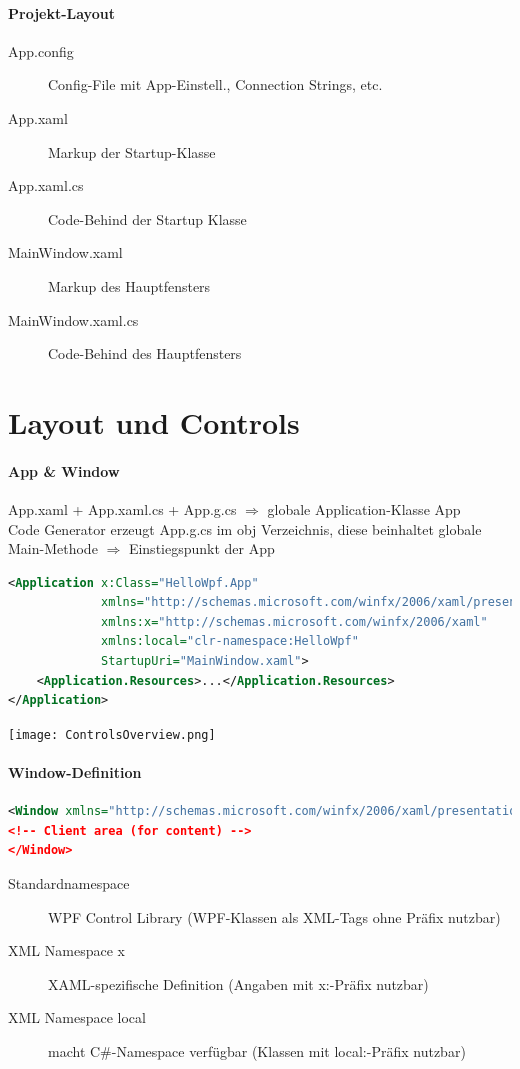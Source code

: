\paragraph{Projekt-Layout}
\begin{description}
    \item[App.config] Config-File mit App-Einstell., Connection Strings, etc.
    \item[App.xaml] Markup der Startup-Klasse
    \item[App.xaml.cs] Code-Behind der Startup Klasse
    \item[MainWindow.xaml] Markup des Hauptfensters
    \item[MainWindow.xaml.cs] Code-Behind des Hauptfensters
\end{description}

\section{Layout und Controls}

\paragraph{App \& Window}
App.xaml + App.xaml.cs + App.g.cs $\Rightarrow$ globale Application-Klasse App \\
Code Generator erzeugt App.g.cs im obj Verzeichnis, diese beinhaltet globale Main-Methode $\Rightarrow$ Einstiegspunkt der App
\begin{lstlisting}[language=xml]
<Application x:Class="HelloWpf.App"
             xmlns="http://schemas.microsoft.com/winfx/2006/xaml/presentation"
             xmlns:x="http://schemas.microsoft.com/winfx/2006/xaml"
             xmlns:local="clr-namespace:HelloWpf" 
             StartupUri="MainWindow.xaml">
    <Application.Resources>...</Application.Resources>
</Application>
\end{lstlisting}

\texttt{[image: ControlsOverview.png]}

\paragraph{Window-Definition}
\begin{lstlisting}[language=xml]
<Window xmlns="http://schemas.microsoft.com/winfx/2006/xaml/presentation" xmlns:x="http://schemas.microsoft.com/winfx/2006/xaml" xmlns:local="clr-namespace:Assignment1.Mvvm.App" x:Class="HelloWpf.MainWindow« Title="AutoWindow" ... > 
<!-- Client area (for content) --> 
</Window>
\end{lstlisting}
\begin{description}
    \item[Standardnamespace] WPF Control Library (WPF-Klassen als XML-Tags ohne Präfix nutzbar)
    \item[XML Namespace x] XAML-spezifische Definition (Angaben mit x:-Präfix nutzbar)
    \item[XML Namespace local] macht C#-Namespace verfügbar (Klassen mit local:-Präfix nutzbar)
\end{description}

